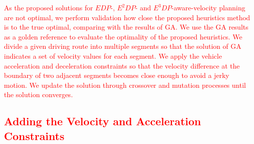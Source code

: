 \documentclass{IEEEtran}
\begin{document}
\textcolor{red}{As the proposed solutions for  $EDP$-, $E^2DP$- and $E^3DP$-aware-velocity planning are not optimal, we perform  validation how close the proposed heuristics method is to the true optimal, comparing with the results of GA. We use the GA results as a golden reference to evaluate the optimality of the proposed heuristics.
We divide a given driving route into multiple segments so that the solution of GA indicates a set of velocity values for each segment. %
We apply the vehicle acceleration and deceleration constraints so that the velocity difference at the boundary of two adjacent segments becomes close enough to avoid a jerky motion. We update the solution through crossover and mutation processes until the solution converges.} 


\textcolor{red}{\subsection{Adding the Velocity and Acceleration Constraints}\label{subsec:constraints}}
\end{document}
